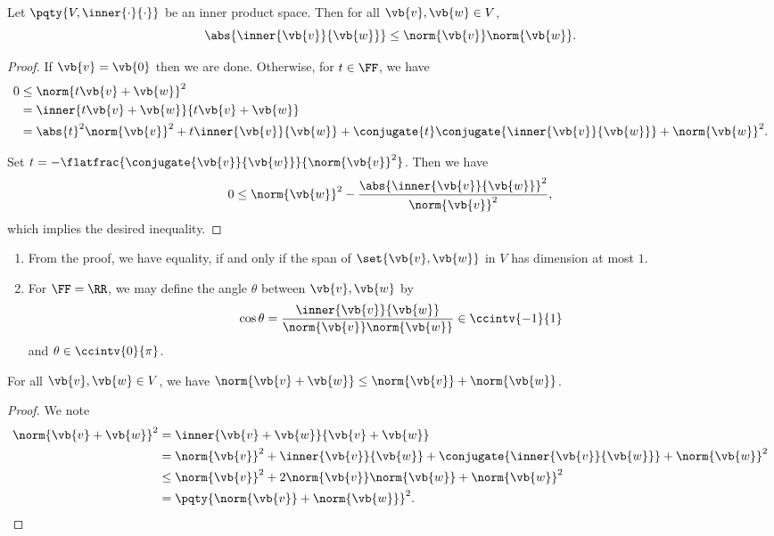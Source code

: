 \begin{lemma}
    Let \(\pqty{V, \inner{\cdot}{\cdot}}\) be an inner product space. Then for all \(\vb{v}, \vb{w} \in V\),
    \[
        \abs{\inner{\vb{v}}{\vb{w}}} \leq \norm{\vb{v}} \norm{\vb{w}}.
    \]
\end{lemma}

\begin{proof}
    If \(\vb{v} = \vb{0}\) then we are done. Otherwise, for \(t \in \FF\), we have
    \begin{align*}
        0 & \leq \norm{t \vb{v} + \vb{w}}^2 \\
        &= \inner{t \vb{v} + \vb{w}}{t \vb{v} + \vb{w}} \\
        &= \abs{t}^2 \norm{\vb{v}}^2 + t \inner{\vb{v}}{\vb{w}} + \conjugate{t} \conjugate{\inner{\vb{v}}{\vb{w}}} + \norm{\vb{w}}^2.
    \end{align*}

    Set \(t = - \flatfrac{\conjugate{\vb{v}}{\vb{w}}}{\norm{\vb{v}}^2}\). Then we have
    \[
        0 \leq \norm{\vb{w}}^2 - \frac{\abs{\inner{\vb{v}}{\vb{w}}}^2}{\norm{\vb{v}}^2},
    \]
    which implies the desired inequality.
\end{proof}

\begin{remarks}
    \begin{enumerate}[label=(\roman*)]
        \item From the proof, we have equality, if and only if the span of \(\set{\vb{v}, \vb{w}}\) in \(V\) has dimension at most \(1\).
        \item For \(\FF = \RR\), we may define the angle \(\theta\) between \(\vb{v}, \vb{w}\) by
        \[
            \cos \theta = \frac{\inner{\vb{v}}{\vb{w}}}{\norm{\vb{v}} \norm{\vb{w}}} \in \ccintv{-1}{1}
        \]
        and \(\theta \in \ccintv{0}{\pi}\).
    \end{enumerate}
\end{remarks}

\begin{corollary}
    For all \(\vb{v}, \vb{w} \in V\), we have \(\norm{\vb{v} + \vb{w}} \leq \norm{\vb{v}} + \norm{\vb{w}}\).
\end{corollary}

\begin{proof}
    We note
    \begin{align*}
        \norm{\vb{v} + \vb{w}}^2 &= \inner{\vb{v} + \vb{w}}{\vb{v} + \vb{w}} \\
        &= \norm{\vb{v}}^2 + \inner{\vb{v}}{\vb{w}} + \conjugate{\inner{\vb{v}}{\vb{w}}} + \norm{\vb{w}}^2 \\
        &\leq \norm{\vb{v}}^2 + 2 \norm{\vb{v}} \norm{\vb{w}} + \norm{\vb{w}}^2 \\
        &= \pqty{\norm{\vb{v}} + \norm{\vb{w}}}^2.
    \end{align*}
\end{proof}

